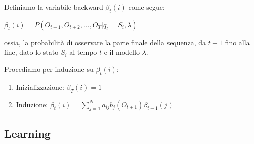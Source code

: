 \documentclass[hyperref={pdfpagelabels=false},slidestop,mathserif,red]{beamer}
\begin{document}
\begin{frame}
 \begin{block}{}
  Definiamo la variabile backward $\beta_{t}(i)$ come segue:
\begin{center}
 $\beta_{t}(i) = P(O_{t+1}, O_{t+2}, \ldots, O_{T} | q_{t} = S_{i}, \lambda)$
\end{center}
ossia, la probabilit\`a di osservare la parte finale della sequenza, da $t+1$ fino alla fine, dato lo stato $S_{i}$ al tempo $t$ e il modello $\lambda$.
 \end{block}
\begin{block}{}
	Procediamo per induzione su $\beta_{t}(i)$:
	\begin{enumerate}
 	\item Inizializzazione: $\beta_{T}(i) = 1$
	\item Induzione: $\beta_{t}(i) = \sum_{j = 1}^{N} a_{ij}b_{j}(O_{t+1})\beta_{t+1}(j)$
	\end{enumerate}
    
\end{block}
 
\end{frame}



\subsection{Learning}
\end{document}

